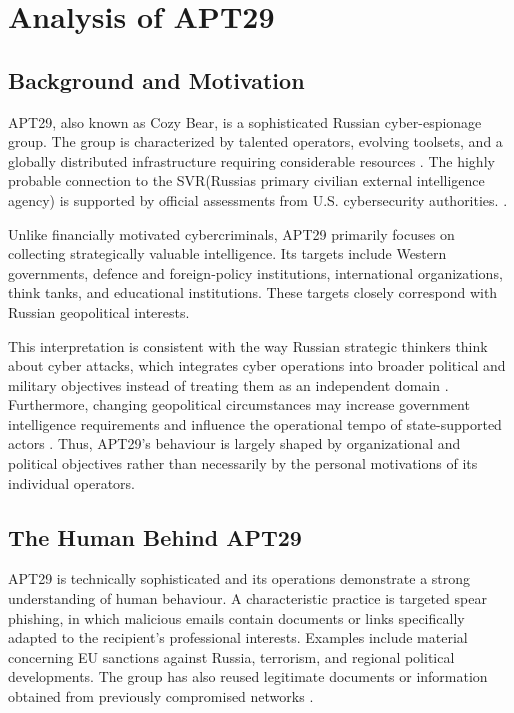 \section{Analysis of APT29}

\subsection{Background and Motivation} 

APT29, also known as Cozy Bear, is a sophisticated Russian cyber-espionage group. The group is characterized by talented operators, evolving toolsets, and a globally distributed infrastructure requiring considerable resources \parencite[69]{geers2015cyber}. The highly probable connection to the SVR(Russias primary civilian external intelligence agency) is supported by official assessments from U.S. cybersecurity authorities. \parencite{cisa-russia-advisories}. 

Unlike financially motivated cybercriminals, APT29 primarily focuses on collecting strategically valuable intelligence. Its targets include Western governments, defence and foreign-policy institutions, international organizations, think tanks, and educational institutions. These targets closely correspond with Russian geopolitical interests. \parencite[69]{geers2015cyber}

This interpretation is consistent with the way Russian strategic thinkers think about cyber attacks, which integrates cyber operations into broader political and military objectives instead of treating them as an independent domain \parencite[69]{geers2015cyber}. Furthermore, changing geopolitical circumstances may increase government intelligence requirements and influence the operational tempo of state-supported actors \parencite[69]{geers2015cyber}. Thus, APT29’s behaviour is largely shaped by organizational and political objectives rather than necessarily by the personal motivations of its individual operators. 

\subsection{The Human Behind APT29}

APT29 is technically sophisticated and its operations demonstrate a strong understanding of human behaviour. A characteristic practice is targeted spear phishing, in which malicious emails contain documents or links specifically adapted to the recipient’s professional interests. Examples include material concerning EU sanctions against Russia, terrorism, and regional political developments. The group has also reused legitimate documents or information obtained from previously compromised networks \parencite[69-70]{geers2015cyber}. 

